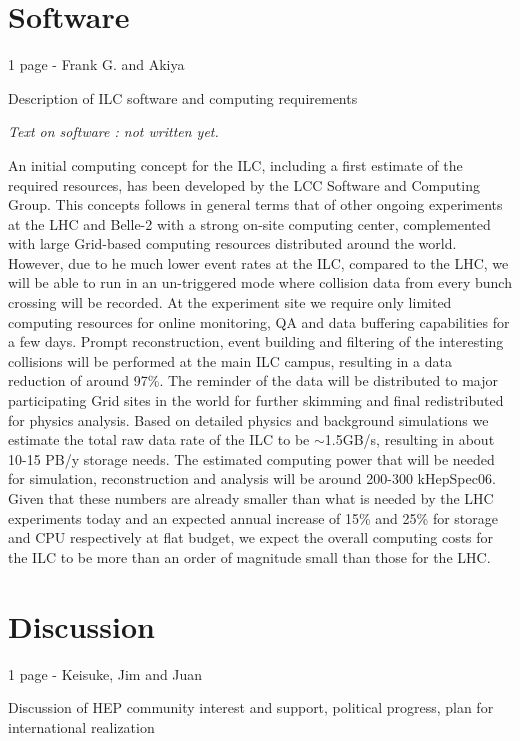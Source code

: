 \documentclass[%
 reprint,
 amsmath,amssymb,
 aps,
]{revtex4-1}
\begin{document}
\section{\label{sec:soft}Software}

1 page - Frank G. and Akiya

  Description of ILC software and computing requirements
  
  {\it Text on software : not written yet. }
  
  An initial computing concept for the ILC, including a first estimate of the required resources, has been developed by the LCC Software and Computing Group.
This concepts follows in general terms that of other ongoing experiments at the LHC and Belle-2 with a strong on-site computing center, complemented with large
Grid-based computing resources distributed around the world. However, due to he much lower event rates at the ILC, compared to the LHC, we will be
able to run in an un-triggered mode where collision data from every bunch crossing will be recorded. At the experiment site we require only limited computing
resources for online monitoring, QA and data buffering capabilities for a few days. Prompt reconstruction, event building and filtering of the interesting collisions
will be performed at the main ILC campus, resulting in a data reduction of around 97\%. The reminder of the data will be distributed to major participating Grid sites
in the world for further skimming and final redistributed for physics analysis.
Based on detailed physics and background simulations we estimate the total raw data rate of the ILC to be $\sim$1.5GB/s, resulting in about 10-15 PB/y storage needs.
The estimated computing power that will be needed for simulation, reconstruction and analysis will be around 200-300 kHepSpec06.
Given that these numbers are already smaller than what is needed by the LHC experiments today and an expected annual increase of 15\% and 25\% for storage and CPU
respectively at flat budget, we expect the overall computing costs for the ILC to be more than an order of magnitude small than those for the LHC.

\section{\label{sec:discuss}Discussion}

1 page - Keisuke, Jim and Juan

    Discussion of HEP community interest and support, political progress, plan for international realization
\end{document}
